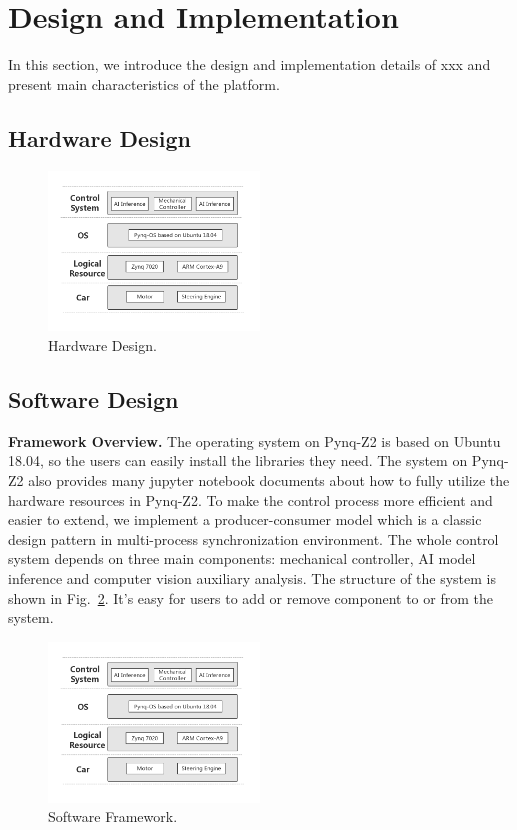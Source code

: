 \documentclass[conference]{IEEEtran}
\begin{document}
\begin{sloppypar}
\section{Design and Implementation}
In this section, we introduce the design and implementation details of xxx and present main characteristics of the platform.

\subsection{Hardware Design}


\begin{figure}[htbp]
\centerline{\includegraphics[width=0.5\textwidth]{sf.jpg}}
\caption{Hardware Design.}
\label{hd}
\end{figure}

\subsection{Software Design}
\textbf{Framework Overview.} The operating system on Pynq-Z2 is based on Ubuntu 18.04, so the users can easily install the libraries they need. The system on Pynq-Z2 also provides many jupyter notebook documents about how to fully utilize the hardware resources in Pynq-Z2. To make the control process more efficient and easier to extend, we implement a producer-consumer model\cite{b18} which is a classic design pattern in multi-process synchronization environment. The whole control system depends on three main components: mechanical controller, AI model inference and computer vision auxiliary analysis. The structure of the system is shown in Fig.~\ref{sf}. It's easy for users to add or remove component to or from the system. 

\begin{figure}[htbp]
\centerline{\includegraphics[width=0.5\textwidth]{sf.jpg}}
\caption{Software Framework.}
\label{sf}
\end{figure}


\end{sloppypar}
\end{document}
